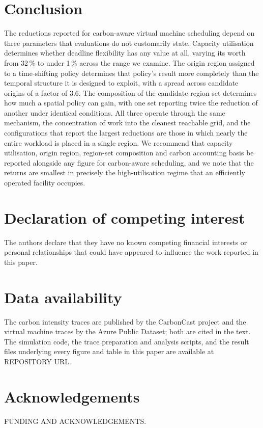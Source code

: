\documentclass[preprint,12pt,authoryear]{elsarticle}
\begin{document}







\section{Conclusion}
\label{sec:conclusion}

The reductions reported for carbon-aware virtual machine scheduling depend on
three parameters that evaluations do not customarily state. Capacity
utilisation determines whether deadline flexibility has any value at all,
varying its worth from 32\,\% to under 1\,\% across the range we examine. The
origin region assigned to a time-shifting policy determines that policy's result
more completely than the temporal structure it is designed to exploit, with a
spread across candidate origins of a factor of 3.6. The composition of the
candidate region set determines how much a spatial policy can gain, with one set
reporting twice the reduction of another under identical conditions. All three
operate through the same mechanism, the concentration of work into the cleanest
reachable grid, and the configurations that report the largest reductions are
those in which nearly the entire workload is placed in a single region. We
recommend that capacity utilisation, origin region, region-set composition and
carbon accounting basis be reported alongside any figure for carbon-aware
scheduling, and we note that the returns are smallest in precisely the
high-utilisation regime that an efficiently operated facility occupies.

\section*{Declaration of competing interest}

The authors declare that they have no known competing financial interests or
personal relationships that could have appeared to influence the work reported
in this paper.

\section*{Data availability}

The carbon intensity traces are published by the CarbonCast project and the
virtual machine traces by the Azure Public Dataset; both are cited in the text.
The simulation code, the trace preparation and analysis scripts, and the result
files underlying every figure and table in this paper are available at
REPOSITORY URL.

\section*{Acknowledgements}

FUNDING AND ACKNOWLEDGEMENTS.



\end{document}
